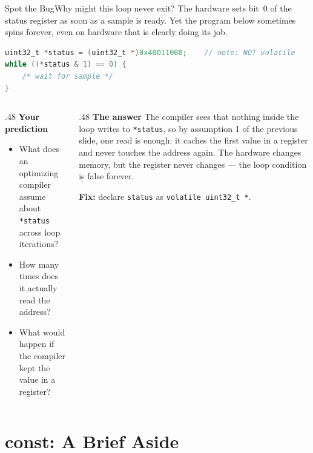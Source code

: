 \documentclass[9pt,aspectratio=169,xcolor=table]{beamer}
\begin{document}
\begin{frame}[fragile]{Spot the Bug}{Why might this loop never exit?}
    \leavevmode
    The hardware sets bit~0 of the status register as soon as a sample is
    ready. Yet the program below sometimes spins forever, even on
    hardware that is clearly doing its job.

    \vspace{3mm}
\begin{lstlisting}[language=C, basicstyle=\ttfamily\footnotesize]
uint32_t *status = (uint32_t *)0x40011000;    // note: NOT volatile
while ((*status & 1) == 0) {
    /* wait for sample */
}
\end{lstlisting}

    \vspace{3mm}
    \begin{columns}[T]
    \begin{column}{.48\textwidth}
        \textbf{Your prediction}
        {\small
        \begin{itemize}\itemsep1pt
            \item What does an optimizing compiler assume about \texttt{*status} across loop iterations?
            \item How many times does it actually read the address?
            \item What would happen if the compiler kept the value in a register?
        \end{itemize}}
    \end{column}
    \begin{column}{.48\textwidth}
        \textbf{The answer}
        {\small The compiler sees that nothing inside the loop writes to \texttt{*status}, so by assumption 1 of the previous slide, one read is enough: it \alert{caches the first value in a register} and never touches the address again. The hardware changes memory, but the register never changes --- the loop condition is false forever.}

        \vspace{1mm}
        {\small \textbf{Fix:} declare \texttt{status} as \texttt{volatile uint32\_t *}.}
    \end{column}
    \end{columns}
\end{frame}

\section{const: A Brief Aside}
\end{document}
